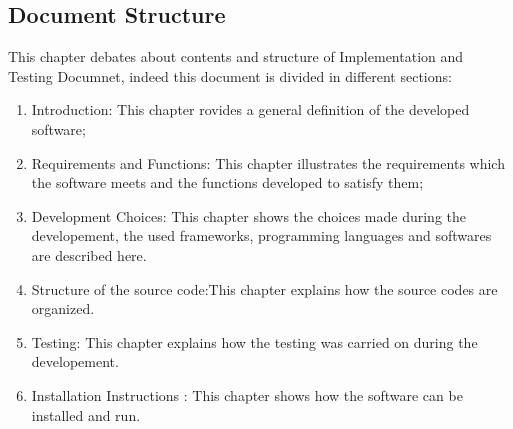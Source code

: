 \subsection{Document Structure}
This chapter debates about contents and structure of Implementation and Testing Documnet, indeed this document is divided in  different sections:
\begin{enumerate}
\item	Introduction: This chapter rovides a general definition of the developed software; 
\item Requirements and Functions: This chapter illustrates the requirements which the software meets and the functions developed to satisfy them;
\item Development Choices: This chapter shows the choices made during the developement, the used frameworks, programming languages and softwares are described here.
\item  Structure of the source code:This chapter explains how the source codes are organized.
\item  Testing: This chapter explains how the testing was carried on during the developement.
\item  Installation Instructions : This chapter shows how the software can be installed and run.
\end{enumerate}
